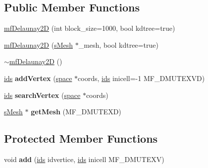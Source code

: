 \subsection*{Public Member Functions}
\begin{DoxyCompactItemize}
\item 
\hyperlink{classmf_1_1mfDelaunay2D_a89a5f35727a56f81198b7d75cb434bb0}{mfDelaunay2D} (int block\_\-size=1000, bool kdtree=true)
\item 
\hyperlink{classmf_1_1mfDelaunay2D_aa897ab81731db78be2c4a9f7acfb0945}{mfDelaunay2D} (\hyperlink{classmf_1_1mfDelaunay2D_ad1c5c239afa497e1c8edef8f1046a58a}{sMesh} $\ast$\_\-mesh, bool kdtree=true)
\item 
\hyperlink{classmf_1_1mfDelaunay2D_a82002feea6869d6b197b8a3a0a0c8f78}{$\sim$mfDelaunay2D} ()
\item 
\hypertarget{classmf_1_1mfDelaunay2D_a0771cbc5d90cd3924be027a2f7273ffe}{
\hyperlink{classmf_1_1mfDelaunay2D_af821015a498654435308272878e686f2}{ids} {\bfseries addVertex} (\hyperlink{classmf_1_1mfDelaunay2D_a97a4b30074ea2f5c4e27605f72155671}{space} $\ast$coords, \hyperlink{classmf_1_1mfDelaunay2D_af821015a498654435308272878e686f2}{ids} inicell=-\/1 MF\_\-DMUTEXVD)}
\label{classmf_1_1mfDelaunay2D_a0771cbc5d90cd3924be027a2f7273ffe}

\item 
\hypertarget{classmf_1_1mfDelaunay2D_a3aebedddacd97da0de5812f7b45592fc}{
\hyperlink{classmf_1_1mfDelaunay2D_af821015a498654435308272878e686f2}{ids} {\bfseries searchVertex} (\hyperlink{classmf_1_1mfDelaunay2D_a97a4b30074ea2f5c4e27605f72155671}{space} $\ast$coords)}
\label{classmf_1_1mfDelaunay2D_a3aebedddacd97da0de5812f7b45592fc}

\item 
\hypertarget{classmf_1_1mfDelaunay2D_af2b38c89bd54f2fb156e654f192c05e8}{
\hyperlink{classmf_1_1mfDelaunay2D_ad1c5c239afa497e1c8edef8f1046a58a}{sMesh} $\ast$ {\bfseries getMesh} (MF\_\-DMUTEXD)}
\label{classmf_1_1mfDelaunay2D_af2b38c89bd54f2fb156e654f192c05e8}

\end{DoxyCompactItemize}
\subsection*{Protected Member Functions}
\begin{DoxyCompactItemize}
\item 
\hypertarget{classmf_1_1mfDelaunay2D_acfd31c77d8c35af38b7e040b2bcdc2a8}{
void {\bfseries add} (\hyperlink{classmf_1_1mfDelaunay2D_af821015a498654435308272878e686f2}{ids} idvertice, \hyperlink{classmf_1_1mfDelaunay2D_af821015a498654435308272878e686f2}{ids} inicell MF\_\-DMUTEXV)}
\label{classmf_1_1mfDelaunay2D_acfd31c77d8c35af38b7e040b2bcdc2a8}

\end{DoxyCompactItemize}
